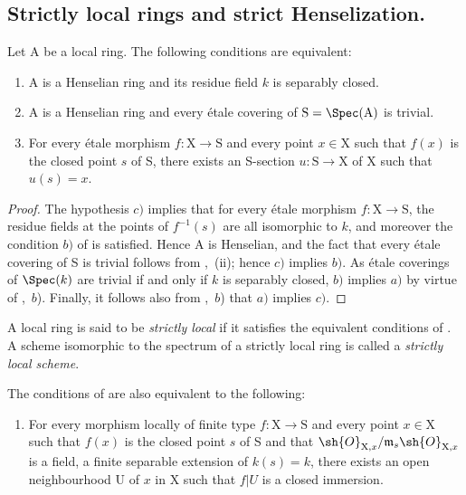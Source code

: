 \subsection{Strictly local rings and strict Henselization.}
\label{subsection:IV.18.8}

\begin{proposition}[18.8.1]
\label{IV.18.8.1}
Let $\mathrm{A}$ be a local ring.
The following conditions are equivalent:
\begin{enumerate}[label=\emph{\alph*)}]
  \item A is a Henselian ring and its residue field $k$ is separably closed.
  \item A is a Henselian ring and every \'{e}tale covering of $\mathrm{S}=\Spec(\mathrm{A})$ is trivial.
  \item For every \'{e}tale morphism $f:\mathrm{X}\to\mathrm{S}$ and every point $x\in\mathrm{X}$ such that $f(x)$ is the closed point $s$ of S, there exists an S-section $u:\mathrm{S}\to\mathrm{X}$ of X such that $u(s)=x$.
\end{enumerate}
\end{proposition}

\begin{proof}
The hypothesis $c)$ implies that for every \'{e}tale morphism $f:\mathrm{X}\to\mathrm{S}$, the residue fields at the points of $f^{-1}(s)$ are all isomorphic to $k$, and moreover the condition $b)$ of  is satisfied.
Hence A is Henselian, and the fact that every \'{e}tale covering of S is trivial follows from ,~(ii);
hence $c)$ implies $b)$.
As \'{e}tale coverings of $\Spec(k)$ are trivial if and only if $k$ is separably closed, $b)$ implies $a)$ by virtue of ,~$b$).
Finally, it follows also from ,~$b$) that $a)$ implies $c)$.
\end{proof}

\begin{definition}[18.8.2]
\label{IV.18.8.2}
A local ring is said to be \emph{strictly local} if it satisfies the equivalent conditions of .
A scheme isomorphic to the spectrum of a strictly local ring is called a \emph{strictly local scheme}.
\end{definition}

\begin{remark}[18.8.3]
\label{IV.18.8.3}
The conditions of  are also equivalent to the following:
\begin{enumerate}
  \item[d)] For every morphism locally of finite type $f:\mathrm{X}\to\mathrm{S}$ and every point $x\in\mathrm{X}$ such that $f(x)$ is the closed point $s$ of S and that $\sh{O}_{\mathrm{X},x}/\mathfrak{m}_s\sh{O}_{\mathrm{X},x}$ is a field, a finite separable extension of $k(s)=k$, there exists an open neighbourhood U of $x$ in X such that $f|U$ is a closed immersion.
\end{enumerate}
\end{remark}

